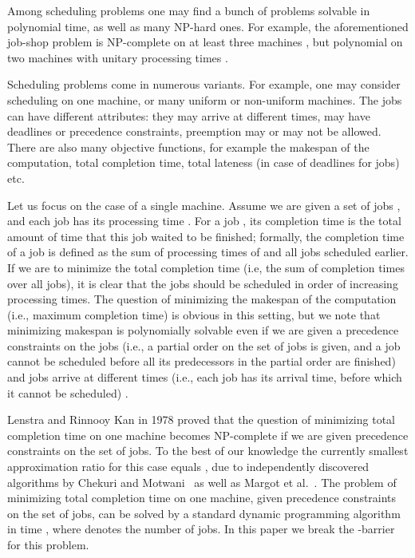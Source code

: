 \documentclass{article}
\theoremstyle{definition}
\begin{document}
Among scheduling problems one may find a bunch of problems solvable in polynomial time, as well as many NP-hard ones.
For example, the aforementioned job-shop problem is NP-complete on at least three machines \cite{job-shop:3},
but polynomial on two machines with unitary processing times \cite{job-shop:2}.

Scheduling problems come in numerous variants. For example, one may consider
scheduling on one machine, or many uniform or non-uniform machines.
The jobs can have different attributes: they may arrive at different times,
may have deadlines or precedence constraints, preemption may or may not be allowed.
There are also many objective functions, for example the makespan of the computation,
total completion time, total lateness (in case of deadlines for jobs) etc.

Let us focus on the case of a single machine. Assume we are given a set of jobs ,
and each job  has its processing time .
For a job , its completion time is the total amount of time that this job waited
to be finished; formally, the completion time of a job  is defined as the sum
of processing times of  and all jobs scheduled earlier.
If we are to minimize the total completion time (i.e, the sum of completion times
over all jobs), it is clear that the jobs should be scheduled in order of increasing
processing times.
The question of minimizing the makespan of the computation (i.e., maximum completion time)
is obvious in this setting, but we note that minimizing makespan is polynomially solvable even
if we are given a precedence constraints on the jobs (i.e., a partial order on the set of jobs
is given, and a job cannot be scheduled before all its predecessors in the partial order
are finished) and jobs arrive at different times (i.e., each job has its arrival time,
  before which it cannot be scheduled) \cite{lawler:sched}.

Lenstra and Rinnooy Kan \cite{lenstra} in 1978 proved that
the question of minimizing total completion time on one machine becomes NP-complete
if we are given precedence constraints on the set of jobs.
To the best of our knowledge the currently smallest approximation ratio for this case equals ,
due to independently discovered algorithms by Chekuri and Motwani~\cite{chekuri} as well as Margot et al.~\cite{margot}.
The problem of minimizing total completion time on one machine, given
precedence constraints on the set of jobs, can be solved
by a standard dynamic programming algorithm in time , where  denotes the
number of jobs.
In this paper we break the -barrier for this problem.
\end{document}

